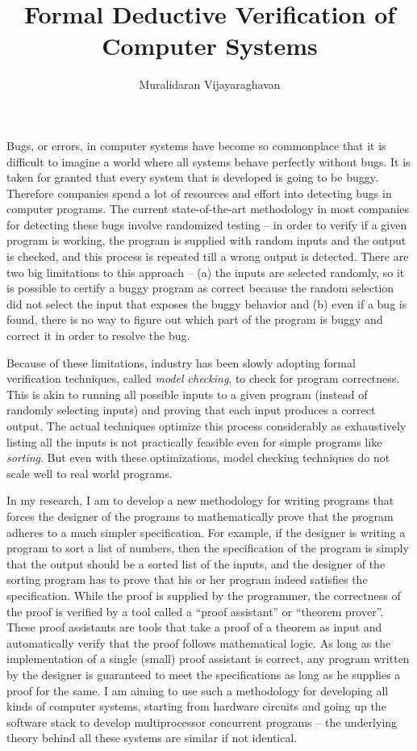 \documentclass{article}
\title{Formal Deductive Verification of Computer Systems}
\date{}
\author{Muralidaran Vijayaraghavan}
\begin{document}
\maketitle
Bugs, or errors, in computer systems have become so commonplace that it is
difficult to imagine a world where all systems behave perfectly without bugs.
It is taken for granted that every system that is developed is going to be
buggy. Therefore companies spend a lot of resources and effort into detecting
bugs in computer programs. The current state-of-the-art methodology in most
companies for detecting these bugs involve randomized testing -- in order to
verify if a given program is working, the program is supplied with random
inputs and the output is checked, and this process is repeated till a wrong
output is detected. There are two big limitations to this approach -- (a) the
inputs are selected randomly, so it is possible to certify a buggy program as
correct because the random selection did not select the input that exposes the
buggy behavior and (b) even if a bug is found, there is no way to figure out
which part of the program is buggy and correct it in order to resolve the bug.

Because of these limitations, industry has been slowly adopting formal
verification techniques, called \emph{model checking}, to check for program
correctness. This is akin to running all possible inputs to a given program
(instead of randomly selecting inputs) and proving that each input produces a
correct output. The actual techniques optimize this process considerably as
exhaustively listing all the inputs is not practically feasible even for simple
programs like \emph{sorting}. But even with these optimizations, model checking
techniques do not scale well to real world programs.

In my research, I am to develop a new methodology for writing programs that
forces the designer of the programs to mathematically prove that the program
adheres to a much simpler specification. For example, if the designer is
writing a program to sort a list of numbers, then the specification of the
program is simply that the output should be a sorted list of the inputs, and
the designer of the sorting program has to prove that his or her program indeed
satisfies the specification. While the proof is supplied by the programmer, the
correctness of the proof is verified by a tool called a ``proof assistant'' or
``theorem prover''. These proof assistants are tools that take a proof of a
theorem as input and automatically verify that the proof follows mathematical
logic. As long as the implementation of a single (small) proof assistant is
correct, any program written by the designer is guaranteed to meet the
specifications as long as he supplies a proof for the same. I am aiming to use
such a methodology for developing all kinds of computer systems, starting from
hardware circuits and going up the software stack to develop multiprocessor
concurrent programs -- the underlying theory behind all these systems are
similar if not identical.
\end{document}
